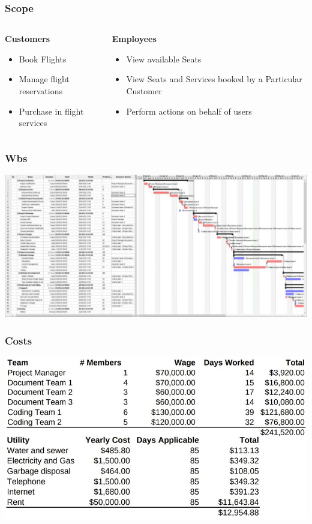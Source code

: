 \documentclass[12pt]{beamer}
\begin{document}
\begin{frame}[plain]
  \frametitle{Scope}
  \begin{columns}
    \begin{column}{0.5\textwidth}
      \textbf{Customers}
      \begin{itemize}
      \item Book Flights
      \item Manage flight reservations
      \item Purchase in flight services
      \end{itemize}
    \end{column}
    \begin{column}{0.5\textwidth}
      \textbf{Employees}
      \begin{itemize}
      \item View available Seats
      \item View Seats and Services booked by a Particular Customer
      \item Perform actions on behalf of users
      \end{itemize}
    \end{column}
  \end{columns}
\end{frame}

\begin{frame}[plain]
  \frametitle{Wbs}
  \includegraphics[width=\textwidth]{wbs}
\end{frame}

\begin{frame}[plain]
  \frametitle{Costs}
  \includegraphics[width=\textwidth]{costs}
\end{frame}
\end{document}
